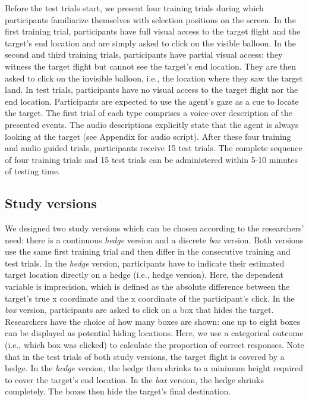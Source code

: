 \documentclass[
  man,floatsintext]{apa6}
\begin{document}
Before the test trials start, we present four training trials during which participants familiarize themselves with selection positions on the screen. In the first training trial, participants have full visual access to the target flight and the target's end location and are simply asked to click on the visible balloon. In the second and third training trials, participants have partial visual access: they witness the target flight but cannot see the target's end location. They are then asked to click on the invisible balloon, i.e., the location where they saw the target land. In test trials, participants have no visual access to the target flight nor the end location. Participants are expected to use the agent's gaze as a cue to locate the target. The first trial of each type comprises a voice-over description of the presented events. The audio descriptions explicitly state that the agent is always looking at the target (see Appendix for audio script). After these four training and audio guided trials, participants receive 15 test trials. The complete sequence of four training trials and 15 test trials can be administered within 5-10 minutes of testing time.

\hypertarget{study-versions}{%
\subsection{Study versions}\label{study-versions}}

We designed two study versions which can be chosen according to the researchers' need: there is a continuous \emph{hedge} version and a discrete \emph{box} version. Both versions use the same first training trial and then differ in the consecutive training and test trials.
In the \emph{hedge} version, participants have to indicate their estimated target location directly on a hedge (i.e., hedge version).
Here, the dependent variable is imprecision, which is defined as the absolute difference between the target's true x coordinate and the x coordinate of the participant's click.
In the \emph{box} version, participants are asked to click on a box that hides the target. Researchers have the choice of how many boxes are shown: one up to eight boxes can be displayed as potential hiding locations. Here, we use a categorical outcome (i.e., which box was clicked) to calculate the proportion of correct responses.
Note that in the test trials of both study versions, the target flight is covered by a hedge. In the \emph{hedge} version, the hedge then shrinks to a minimum height required to cover the target's end location. In the \emph{box} version, the hedge shrinks completely. The boxes then hide the target's final destination.
\end{document}
